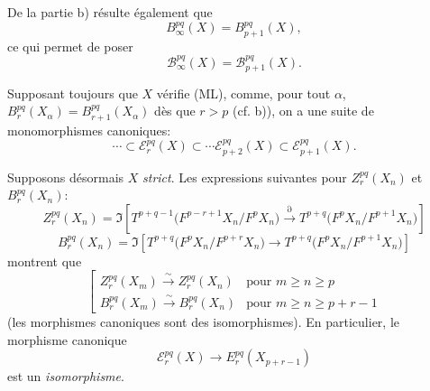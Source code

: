 De la partie b) résulte également que
\[
B_\infty^{pq}(X)=B_{p+1}^{pq}(X),
\]
ce qui permet de poser
\[
\mathcal{B}_\infty^{pq}(X)=\mathcal{B}_{p+1}^{pq}(X).
\]

Supposant toujours que \(X\) vérifie (ML), comme, pour tout \(\alpha\),
\(B_r^{pq}(X_\alpha)=B_{r+1}^{pq}(X_\alpha)\) dès que \(r>p\) (cf. b)),
on a une suite de monomorphismes canoniques:
\begin{equation}
\cdots\subset\mathcal{E}_r^{pq}(X)\subset\cdots\mathcal{E}_{p+2}^{pq}(X)\subset\mathcal{E}_{p+1}^{pq}(X).
\tag{S}
\end{equation}

Supposons désormais \(X\) \emph{strict}. Les expressions suivantes pour \(Z_r^{pq}(X_n)\) et \(B_r^{pq}(X_n)\):
\[
Z_r^{pq}(X_n)=
\Im\!\left[
T^{p+q-1}\bigl(F^{p-r+1}X_n/F^pX_n\bigr)
\xrightarrow{\partial}
T^{p+q}\bigl(F^pX_n/F^{p+1}X_n\bigr)
\right]
\]
\[
B_r^{pq}(X_n)=
\Im\!\left[
T^{p+q}\bigl(F^pX_n/F^{p+r}X_n\bigr)
\longrightarrow
T^{p+q}\bigl(F^pX_n/F^{p+1}X_n\bigr)
\right]
\]
montrent que
\begin{equation}
\left[
\begin{array}{ll}
Z_r^{pq}(X_m)\xrightarrow{\sim}Z_r^{pq}(X_n)&\text{pour }m\ge n\ge p\\[3pt]
B_r^{pq}(X_m)\xrightarrow{\sim}B_r^{pq}(X_n)&\text{pour }m\ge n\ge p+r-1
\end{array}
\right.
\tag{\(d_1\)}
\end{equation}
(les morphismes canoniques sont des isomorphismes). En particulier, le morphisme canonique
\[
\mathcal{E}_r^{pq}(X)\longrightarrow E_r^{pq}(X_{p+r-1})
\]
est un \emph{isomorphisme}.

